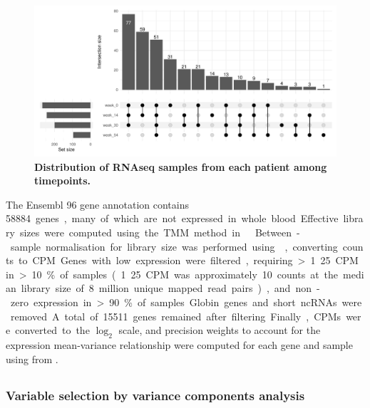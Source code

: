 \begin{figure}
    \centering
    \includegraphics[width=1.0\textwidth,page=1]{mainmatter/figures/chapter_04/process_pheno.pheno_filtered_dge.Visit_Label_upset.pdf}
    \caption{
        \textbf{Distribution of \gls{RNAseq} samples from each patient among timepoints.}
    }
    \label{fig:multipants_visits_upset}
\end{figure}

The Ensembl 96 gene annotation contains \SI{58884} genes, many of which are not expressed in whole blood.
Effective library sizes were computed using the \gls{TMM} method in  \autocite{robinson2010EdgeRBioconductorPackage}.
Between-sample normalisation for library size was performed using , converting counts to \gls{CPM}.
Genes with low expression were filtered,
requiring >1.25 CPM in >10\% of samples (1.25 \gls{CPM} was approximately 10 counts at the median library size of 8 million unique mapped read pairs),
and non-zero expression in >90\% of samples.
Globin genes and short \glspl{ncRNA} were removed.
A total of \num{15511} genes remained after filtering.
Finally, \glspl{CPM} were converted to the $\log_{2}$ scale, and precision weights to account for the expression mean-variance relationship were computed for each gene and sample using  from  \autocite{hoffman2016VariancePartitionInterpretingDrivers}.

\subsection{}

\subsubsection{Variable selection by variance components analysis}
\label{subsubsec:multiPANTS_var_selection}

